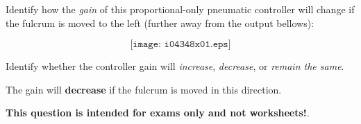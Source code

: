 

Identify how the {\it gain} of this proportional-only pneumatic controller will change if the fulcrum is moved to the left (further away from the output bellows):

$$\texttt{[image: i04348x01.eps]}$$

Identify whether the controller gain will {\it increase}, {\it decrease}, or {\it remain the same}.

\vskip 30pt







The gain will {\bf decrease} if the fulcrum is moved in this direction.







{\bf This question is intended for exams only and not worksheets!}.



